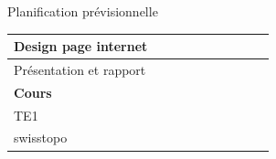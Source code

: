 \documentclass{beamer}
\begin{document}
\begin{frame}{Planification prévisionnelle}
\begin{table}
\begin{tabular}{l|l|l|l|l|l|l|l|l|l|}
            Design page internet             &                                   & \cellcolor{o}                     & \cellcolor{o}                     & \cellcolor{o}                     & \cellcolor{o}                     & \cellcolor{o}                     & \cellcolor{o}                     &                                   &                                   \\ \hline
            Présentation et rapport          &                                   &                                   &                                   &                                   &                                   &                                   &                                   & \cellcolor{o}                     & \cellcolor{o}                     \\ \hline \hline
            \textbf{Cours}                   &                                   &                                   &                                   &                                   &                                   &                                   &                                   &                                   &                                   \\ \hline
            TE1                              &                                   &                                   &                                   & \cellcolor{o}                     &                                   &                                   &                                   &                                   &                                   \\ \hline
            swisstopo                        &                                   &                                   &                                   &                                   &                                   &                                   &                                   & \cellcolor{o}                     &                                   \\ \hline
            \hline
        \end{tabular}
    \end{table}
\end{frame}
\end{document}
